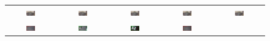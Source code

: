 \begin{figure}[th]
\centering
\begin{tabular}{@{}c@{\,\,\,}c@{\,\,\,}c@{\,\,\,}c@{\,\,\,}c@{\,\,\,}}
\includegraphics[width=0.2\textwidth]{figures/chapter2/search_t0.jpg} &
\includegraphics[width=0.2\textwidth]{figures/chapter2/search_t3.jpg} &
\includegraphics[width=0.2\textwidth]{figures/chapter2/search_t8.jpg} &
\includegraphics[width=0.2\textwidth]{figures/chapter2/search_t13.jpg} &
\includegraphics[width=0.2\textwidth]{figures/chapter2/search_t17} \\
\includegraphics[width=0.2\textwidth]{figures/chapter2/bing_t0.jpg} &
\includegraphics[width=0.2\textwidth]{figures/chapter2/bing_t3.jpg} &
\includegraphics[width=0.2\textwidth]{figures/chapter2/bing_t8.jpg} &
\includegraphics[width=0.2\textwidth]{figures/chapter2/bing_t13.jpg} &

\end{tabular}
\end{figure}
